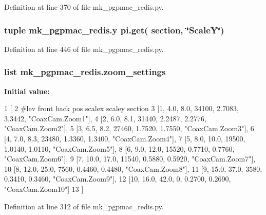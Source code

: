 Definition at line 370 of file mk\-\_\-pgpmac\-\_\-redis.\-py.

\hypertarget{namespacemk__pgpmac__redis_a34220d58136fb95853f54ed51a130f79}{
\subsubsection[{y}]{\setlength{\rightskip}{0pt plus 5cm}tuple mk\-\_\-pgpmac\-\_\-redis.\-y pi.\-get( section, \char`\"{}Scale\-Y\char`\"{})}}\label{namespacemk__pgpmac__redis_a34220d58136fb95853f54ed51a130f79}


Definition at line 446 of file mk\-\_\-pgpmac\-\_\-redis.\-py.

\hypertarget{namespacemk__pgpmac__redis_ad91bac9be746f99e1cf1f8e28ff348be}{
\subsubsection[{zoom\-\_\-settings}]{\setlength{\rightskip}{0pt plus 5cm}list mk\-\_\-pgpmac\-\_\-redis.\-zoom\-\_\-settings}}\label{namespacemk__pgpmac__redis_ad91bac9be746f99e1cf1f8e28ff348be}
{\bfseries Initial value\-:}
\begin{DoxyCode}
1 [
2     \textcolor{comment}{#lev   front  back  pos     scalex  scaley   section}
3     [1,     4.0,   8.0,  34100, 2.7083,  3.3442, \textcolor{stringliteral}{"CoaxCam.Zoom1"}],
4     [2,     6.0,   8.1,  31440, 2.2487,  2.2776, \textcolor{stringliteral}{"CoaxCam.Zoom2"}],
5     [3,     6.5,   8.2,  27460, 1.7520,  1.7550, \textcolor{stringliteral}{"CoaxCam.Zoom3"}],
6     [4,     7.0,   8.3,  23480, 1.3360,  1.3400, \textcolor{stringliteral}{"CoaxCam.Zoom4"}],
7     [5,     8.0,  10.0,  19500, 1.0140,  1.0110, \textcolor{stringliteral}{"CoaxCam.Zoom5"}],
8     [6,     9.0,  12.0,  15520, 0.7710,  0.7760, \textcolor{stringliteral}{"CoaxCam.Zoom6"}],
9     [7,    10.0,  17.0,  11540, 0.5880,  0.5920, \textcolor{stringliteral}{"CoaxCam.Zoom7"}],
10     [8,    12.0,  25.0,   7560, 0.4460,  0.4480, \textcolor{stringliteral}{"CoaxCam.Zoom8"}],
11     [9,    15.0,  37.0,   3580, 0.3410,  0.3460, \textcolor{stringliteral}{"CoaxCam.Zoom9"}],
12     [10,   16.0,  42.0,      0, 0.2700,  0.2690, \textcolor{stringliteral}{"CoaxCam.Zoom10"}]
13     ]
\end{DoxyCode}


Definition at line 312 of file mk\-\_\-pgpmac\-\_\-redis.\-py.


